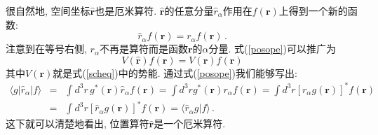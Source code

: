 \documentclass[b5paper]{book}
\begin{document}
很自然地, 空间坐标$\hat{\mathbf{r}}$也是厄米算符. $\hat{\mathbf{r}}$的任意分量$\hat{r}_\alpha$作用在$f(\mathbf{r})$上得到一个新的函数:
\begin{equation}\label{posope}
\hat{r}_\alpha f(\mathbf{r})=r_\alpha f(\mathbf{r})\,.
\end{equation}
注意到在等号右侧, $r_\alpha$不再是算符而是函数$\mathbf{r}$的$\alpha$分量. 式(\ref{posope})可以推广为
\begin{equation}
V(\hat{\mathbf{r}})f(\mathbf{r})=V(\mathbf{r})f(\mathbf{r})
\end{equation}
其中$V(\mathbf{r})$就是式(\ref{scheq})中的势能. 通过式(\ref{posope})我们能够写出:
\begin{eqnarray}
\langle g| \hat{r}_\alpha |f\rangle &=&\int d^3r\, g^*(\mathbf{r})\hat{r}_\alpha f(\mathbf{r})=\int d^3r g^*(\mathbf{r})r_\alpha f(\mathbf{r})=\int d^3 r[r_\alpha g(\mathbf{r})]^* f(\mathbf{r})\nonumber\\
&=&\int d^3r [\hat{r}_\alpha g(\mathbf{r})]^* f(\mathbf{r})=\langle \hat{r}_\alpha g|f\rangle \,.
\end{eqnarray}
这下就可以清楚地看出, 位置算符$\hat{\mathbf{r}}$是一个厄米算符.
\end{document}
